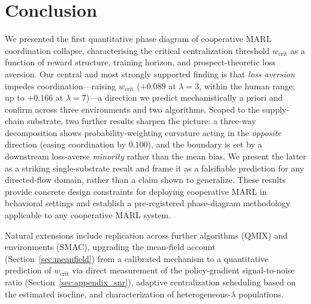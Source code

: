 \documentclass[letterpaper]{article}
\theoremstyle{plain}
\newcommand{\wcrit}{w_{\mathrm{crit}}}
\begin{document}
\section{Conclusion}
\label{sec:conclusion}

We presented the first quantitative phase diagram of cooperative MARL
coordination collapse, characterising the critical centralization threshold
$\wcrit$ as a function of reward structure, training horizon, and
prospect-theoretic loss aversion.
Our central and most strongly supported finding is that \emph{loss aversion}
impedes coordination---raising $\wcrit$ ($+0.089$ at $\lambda{=}3$, within the
human range; up to $+0.166$ at $\lambda{=}7$)---a direction we predict
mechanistically a priori and confirm across three environments and two
algorithms. Scoped to the supply-chain substrate, two further results sharpen
the picture: a three-way decomposition shows probability-weighting curvature
acting in the \emph{opposite} direction (easing coordination by $0.100$), and
the boundary is set by a downstream loss-averse \emph{minority} rather than the
mean bias. We present the latter as a striking single-substrate result and frame
it as a falsifiable prediction for any directed-flow domain, rather than a
claim shown to generalize.
These results provide concrete design constraints for deploying cooperative
MARL in behavioral settings and establish a pre-registered phase-diagram
methodology applicable to any cooperative MARL system.

Natural extensions include replication across further algorithms (QMIX) and
environments (SMAC), upgrading the mean-field account
(Section~\ref{sec:meanfield}) from a calibrated mechanism to a quantitative
prediction of $\wcrit$ via direct measurement of the policy-gradient
signal-to-noise ratio (Section~\ref{sec:appendix_snr}), adaptive centralization
scheduling based on the estimated isocline, and characterization of
heterogeneous-$\lambda$ populations.



\appendix
\end{document}
